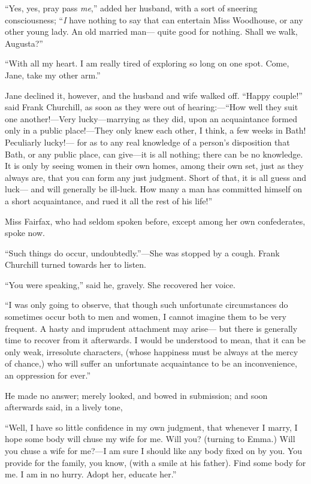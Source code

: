 ``Yes, yes, pray pass \emph{me},'' added her husband, with a sort of
sneering consciousness; ``\emph{I} have nothing to say that can entertain
Miss Woodhouse, or any other young lady.  An old married man---%
quite good for nothing.  Shall we walk, Augusta?''

``With all my heart.  I am really tired of exploring so long
on one spot.  Come, Jane, take my other arm.''

Jane declined it, however, and the husband and wife walked off.
``Happy couple!'' said Frank Churchill, as soon as they were out
of hearing:---``How well they suit one another!---Very lucky---marrying as
they did, upon an acquaintance formed only in a public place!---They only
knew each other, I think, a few weeks in Bath!  Peculiarly lucky!---%
for as to any real knowledge of a person's disposition that Bath,
or any public place, can give---it is all nothing; there can be
no knowledge.  It is only by seeing women in their own homes,
among their own set, just as they always are, that you can form
any just judgment.  Short of that, it is all guess and luck---%
and will generally be ill-luck. How many a man has committed himself
on a short acquaintance, and rued it all the rest of his life!''

Miss Fairfax, who had seldom spoken before, except among her
own confederates, spoke now.

``Such things do occur, undoubtedly.''---She was stopped by a cough.
Frank Churchill turned towards her to listen.

``You were speaking,'' said he, gravely.  She recovered her voice.

``I was only going to observe, that though such unfortunate circumstances
do sometimes occur both to men and women, I cannot imagine them
to be very frequent.  A hasty and imprudent attachment may arise---%
but there is generally time to recover from it afterwards.  I would
be understood to mean, that it can be only weak, irresolute characters,
(whose happiness must be always at the mercy of chance,)
who will suffer an unfortunate acquaintance to be an inconvenience,
an oppression for ever.''

He made no answer; merely looked, and bowed in submission; and soon
afterwards said, in a lively tone,

``Well, I have so little confidence in my own judgment, that whenever
I marry, I hope some body will chuse my wife for me.  Will you?
(turning to Emma.) Will you chuse a wife for me?---I am sure I
should like any body fixed on by you.  You provide for the family,
you know, (with a smile at his father). Find some body for me.
I am in no hurry.  Adopt her, educate her.''

